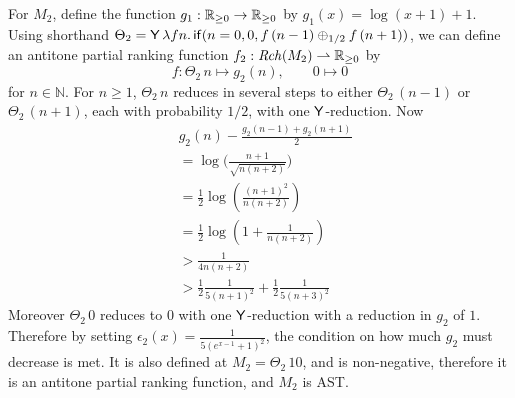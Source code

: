 \begin{example}
\label{ex:unbiased random walk}
For $M_2$, define the function $g_1 : \mathbb{R}_{{\geq}0} \to \mathbb{R}_{{\geq}0}$ by $g_1(x) = \log(x+1) + 1$.
Using shorthand 
$\Theta_2 = \mathsf{Y} \, \lambda f n . \, 
\mathsf{if}(n = 0, 0, f \, (n - 1) \oplus_{1/2} f \, (n + 1))$, 
we can define an antitone partial ranking function $f_2 : \mathit{Rch}(M_2) \rightharpoonup \mathbb{R}_{{\geq}0}$ 
by
\[
f: {\Theta_2} \, n 
\mapsto 
g_2(n), \qquad 
0 \mapsto 0
\]
for $n \in \mathbb N$.
For $n \geq 1$, $\Theta_2 \, n$ reduces in several steps to either $\Theta_2 \, (n-1)$ or $\Theta_2 \, (n+1)$, each with probability $1/2$, with one $\mathsf{Y}$-reduction.
Now
\begin{align*}
& g_2(n) - \frac{g_2(n-1) + g_2(n+1)} 2 \\
  &=  \log \Big(\frac{n+1}{\sqrt{n(n+2)}}\Big) \\
  &=  \frac 1 2 \log\left(\frac{(n+1)^2}{n(n+2)}\right) \\
  &=  \frac 1 2 \log\left(1 + \frac 1 {n(n+2)}\right) \\
  &>  \frac 1 {4n(n+2)} \\
  &>  \frac 1 2 \frac 1 {5(n+1)^2} + \frac 1 2 \frac 1 {5(n+3)^2}
\end{align*}
Moreover $\Theta_2 \, 0$ reduces to $0$ with one $\mathsf{Y}$-reduction with a reduction in $g_2$ of $1$.
Therefore by setting $\epsilon_2(x) = \frac 1 {5(e^{x-1}+1)^2}$, the condition on how much $g_2$ must decrease is met. It is also defined at $M_2 = \Theta_2 \, 10$, and is non-negative, therefore it is an antitone partial ranking function, and $M_2$ is AST.
\end{example}

